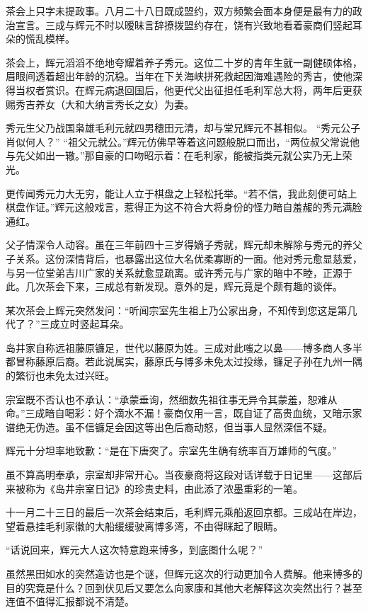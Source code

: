 \documentclass[
]{book}
\begin{document}
茶会上只字未提政事。八月二十八日既成盟约，双方频繁会面本身便是最有力的政治宣言。三成与辉元不时以暧昧言辞撩拨盟约存在，饶有兴致地看着豪商们竖起耳朵的慌乱模样。

茶会上，辉元滔滔不绝地夸耀着养子秀元。这位二十岁的青年生就一副健硕体格，眉眼间透着超出年龄的沉稳。当年在下关海峡拼死救起因海难遇险的秀吉，使他深得当权者赏识。在辉元病退回国后，他更代父出征担任毛利军总大将，两年后更获赐秀吉养女（大和大纳言秀长之女）为妻。

秀元生父乃战国枭雄毛利元就四男穗田元清，却与堂兄辉元不甚相似。
``秀元公子肖似何人？''
``祖父元就公。''辉元仿佛早等着这问题般脱口而出，``两位叔父常说他与先父如出一辙。''那自豪的口吻昭示着：在毛利家，能被指类元就公实乃无上荣光。

更传闻秀元力大无穷，能让人立于棋盘之上轻松托举。``若不信，我此刻便可站上棋盘作证。''辉元这般戏言，惹得正为这不符合大将身份的怪力暗自羞赧的秀元满脸通红。

父子情深令人动容。虽在三年前四十三岁得嫡子秀就，辉元却未解除与秀元的养父子关系。这份深情背后，也暴露出这位大名优柔寡断的一面。他对秀元愈显慈爱，与另一位堂弟吉川广家的关系就愈显疏离。或许秀元与广家的暗中不睦，正源于此。几次茶会下来，三成总有新发现。意外的是，辉元竟是个颇有趣的谈伴。

某次茶会上辉元突然发问：``听闻宗室先生祖上乃公家出身，不知传到您这是第几代了？''三成立时竖起耳朵。

岛井家自称远祖藤原镰足，世代以藤原为姓。三成对此嗤之以鼻------博多商人多半都冒称藤原后裔。若此说属实，藤原氏与博多未免太过投缘，镰足子孙在九州一隅的繁衍也未免太过兴旺。

宗室既不否认也不承认：``承蒙垂询，然细数先祖往事无异令其蒙羞，恕难从命。''三成暗自喝彩：好个滴水不漏！豪商仅用一言，既自证了高贵血统，又暗示家谱绝无伪造。虽不信镰足会因这等出色后裔动怒，但当事人显然深信不疑。

辉元十分坦率地致歉：``是在下唐突了。宗室先生确有统率百万雄师的气度。''

虽不算高明奉承，宗室却非常开心。当夜豪商将这段对话详载于日记里------这部后来被称为《岛井宗室日记》的珍贵史料，由此添了浓墨重彩的一笔。

十一月二十三日的最后一次茶会结束后，毛利辉元乘船返回京都。三成站在岸边，望着悬挂毛利家徽的大船缓缓驶离博多湾，不由得眯起了眼睛。

``话说回来，辉元大人这次特意跑来博多，到底图什么呢？''

虽然黑田如水的突然造访也是个谜，但辉元这次的行动更加令人费解。他来博多的目的究竟是什么？回到伏见后又要怎么向家康和其他大老解释这次突然出行？甚至连值不值得汇报都说不清楚。
\end{document}
